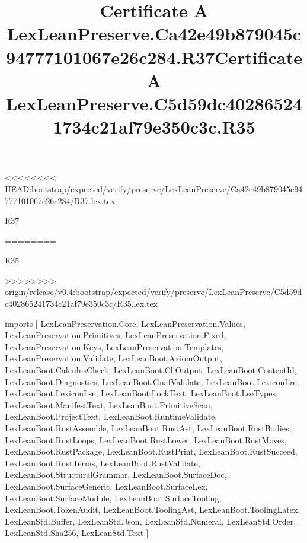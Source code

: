 <<<<<<<< HEAD:bootstrap/expected/verify/preserve/LexLeanPreserve/Ca42e49b879045c94777101067e26c284/R37.lex.tex
\begin{lexlean}{R37}
\title{Certificate A LexLeanPreserve.Ca42e49b879045c94777101067e26c284.R37}
========
\begin{lexlean}{R35}
\title{Certificate A LexLeanPreserve.C5d59dc402865241734c21af79e350c3c.R35}
>>>>>>>> origin/release/v0.4:bootstrap/expected/verify/preserve/LexLeanPreserve/C5d59dc402865241734c21af79e350c3c/R35.lex.tex
\begin{coremodule}
imports [
  LexLeanPreservation.Core,
  LexLeanPreservation.Values,
  LexLeanPreservation.Primitives,
  LexLeanPreservation.Fixed,
  LexLeanPreservation.Keys,
  LexLeanPreservation.Templates,
  LexLeanPreservation.Validate,
  LexLeanBoot.AxiomOutput,
  LexLeanBoot.CalculusCheck,
  LexLeanBoot.CliOutput,
  LexLeanBoot.ContentId,
  LexLeanBoot.Diagnostics,
  LexLeanBoot.GnafValidate,
  LexLeanBoot.LexiconLre,
  LexLeanBoot.LexiconLse,
  LexLeanBoot.LockText,
  LexLeanBoot.LseTypes,
  LexLeanBoot.ManifestText,
  LexLeanBoot.PrimitiveScan,
  LexLeanBoot.ProjectText,
  LexLeanBoot.RuntimeValidate,
  LexLeanBoot.RustAssemble,
  LexLeanBoot.RustAst,
  LexLeanBoot.RustBodies,
  LexLeanBoot.RustLoops,
  LexLeanBoot.RustLower,
  LexLeanBoot.RustMoves,
  LexLeanBoot.RustPackage,
  LexLeanBoot.RustPrint,
  LexLeanBoot.RustSucceed,
  LexLeanBoot.RustTerms,
  LexLeanBoot.RustValidate,
  LexLeanBoot.StructuralGrammar,
  LexLeanBoot.SurfaceDoc,
  LexLeanBoot.SurfaceGeneric,
  LexLeanBoot.SurfaceLex,
  LexLeanBoot.SurfaceModule,
  LexLeanBoot.SurfaceTooling,
  LexLeanBoot.TokenAudit,
  LexLeanBoot.ToolingAst,
  LexLeanBoot.ToolingLatex,
  LexLeanStd.Buffer,
  LexLeanStd.Json,
  LexLeanStd.Numeral,
  LexLeanStd.Order,
  LexLeanStd.Sha256,
  LexLeanStd.Text
]


\end{coremodule}
\end{lexlean}
\end{lexlean}

